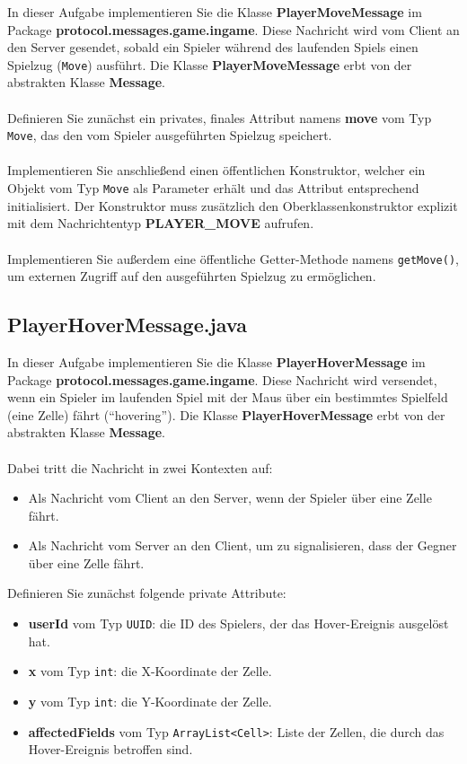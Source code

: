 \documentclass[12pt]{article}
\begin{document}
In dieser Aufgabe implementieren Sie die Klasse \textbf{PlayerMoveMessage} im Package \textbf{protocol.messages.game.ingame}. Diese Nachricht wird vom Client an den Server gesendet, sobald ein Spieler während des laufenden Spiels einen Spielzug (\texttt{Move}) ausführt. Die Klasse \textbf{PlayerMoveMessage} erbt von der abstrakten Klasse \textbf{Message}.
\\ \\
Definieren Sie zunächst ein privates, finales Attribut namens \textbf{move} vom Typ \texttt{Move}, das den vom Spieler ausgeführten Spielzug speichert.
\\ \\
Implementieren Sie anschließend einen öffentlichen Konstruktor, welcher ein Objekt vom Typ \texttt{Move} als Parameter erhält und das Attribut entsprechend initialisiert. Der Konstruktor muss zusätzlich den Oberklassenkonstruktor explizit mit dem Nachrichtentyp \textbf{PLAYER\_MOVE} aufrufen.
\\ \\
Implementieren Sie außerdem eine öffentliche Getter-Methode namens \texttt{getMove()}, um externen Zugriff auf den ausgeführten Spielzug zu ermöglichen.

\subsection*{PlayerHoverMessage.java}

In dieser Aufgabe implementieren Sie die Klasse \textbf{PlayerHoverMessage} im Package \textbf{protocol.messages.game.ingame}. Diese Nachricht wird versendet, wenn ein Spieler im laufenden Spiel mit der Maus über ein bestimmtes Spielfeld (eine Zelle) fährt (``hovering''). Die Klasse \textbf{PlayerHoverMessage} erbt von der abstrakten Klasse \textbf{Message}.
\\ \\
Dabei tritt die Nachricht in zwei Kontexten auf:
\begin{itemize}
    \item Als Nachricht vom Client an den Server, wenn der Spieler über eine Zelle fährt.
    \item Als Nachricht vom Server an den Client, um zu signalisieren, dass der Gegner über eine Zelle fährt.
\end{itemize}

Definieren Sie zunächst folgende private Attribute:
\begin{itemize}
    \item \textbf{userId} vom Typ \texttt{UUID}: die ID des Spielers, der das Hover-Ereignis ausgelöst hat.
    \item \textbf{x} vom Typ \texttt{int}: die X-Koordinate der Zelle.
    \item \textbf{y} vom Typ \texttt{int}: die Y-Koordinate der Zelle.
    \item \textbf{affectedFields} vom Typ \texttt{ArrayList<Cell>}: Liste der Zellen, die durch das Hover-Ereignis betroffen sind.
\end{itemize}
\end{document}
